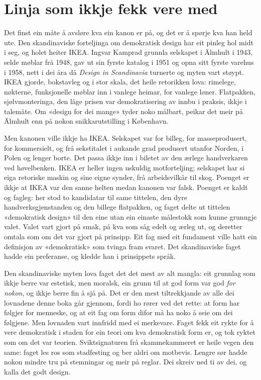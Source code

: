 \section{Linja som ikkje fekk vere med}

Det finst ein måte å avsløre kva ein kanon er på, og det er å spørje kva han held ute. Den skandinaviske forteljinga om demokratisk design har eit pinleg hol midt i seg, og holet heiter IKEA. Ingvar Kamprad grunnla selskapet i Älmhult i 1943, selde møblar frå 1948, gav ut sin fyrste katalog i 1951 og opna sitt fyrste varehus i 1958, nett i dei åra då \textit{Design in Scandinavia} turnerte og myten vart støypt. IKEA gjorde, bokstavleg og i stor skala, det heile retorikken lova: rimelege, nøkterne, funksjonelle møblar inn i vanlege heimar, for vanlege løner. Flatpakken, sjølvmonteringa, den låge prisen var demokratisering av innbu i praksis, ikkje i talemåte. Om «design for dei mange» tyder noko målbart, peikar det meir på Älmhult enn på nokon snikkarutstilling i København.

Men kanonen ville ikkje ha IKEA. Selskapet var for billeg, for masseprodusert, for kommersielt, og frå sekstitalet i aukande grad produsert utanfor Norden, i Polen og lenger borte. Det passa ikkje inn i biletet av den ærlege handverkaren ved høvelbenken. IKEA er heller ingen uskuldig motforteljing; selskapet har si eiga retoriske maskin og sine eigne synder, frå arbeidsvilkår til skog. Poenget er ikkje at IKEA var den sanne helten medan kanonen var falsk. Poenget er kaldt og fagleg: her stod to kandidatar til same tittelen, den dyre handverksgjenstanden og den billege flatpakken, og faget delte ut tittelen «demokratisk design» til den eine utan ein einaste målestokk som kunne grunngje valet. Valet vart gjort på smak, på kva som såg edelt og ærleg ut, og deretter omtala som om det var gjort på prinsipp. Eit fag med eit fundament ville hatt ein definisjon av «demokratisk» som tvinga fram svaret. Det skandinaviske faget hadde ein preferanse, og kledde han i prinsippets språk.

\vignett

Den skandinaviske myten lova faget det det mest av alt mangla: eit grunnlag som ikkje berre var estetisk, men moralsk, ein grunn til at god form var god \emph{for nokon}, og ikkje berre fin å sjå på. Det er den mest tiltrekkjande av alle dei lovnadene denne boka går gjennom, fordi ho rører ved det rette: at form har følgjer for menneske, og at eit fag om form difor må ha noko å seie om dei følgjene. Men lovnaden vart innfridd med ei merkevare. Faget fekk eit rykte for å vere demokratisk i staden for ein teori om kva demokratisk form er, og tok ryktet som om det var teorien. Sviktsignaturen frå skammekammeret er heile vegen den same: faget les ros som stadfesting og ber aldri om motbevis. Lengre sør hadde nokon mindre tru på stemningar og meir på reglar. Dei skreiv ned ti av dei, og kalla det godt design.

